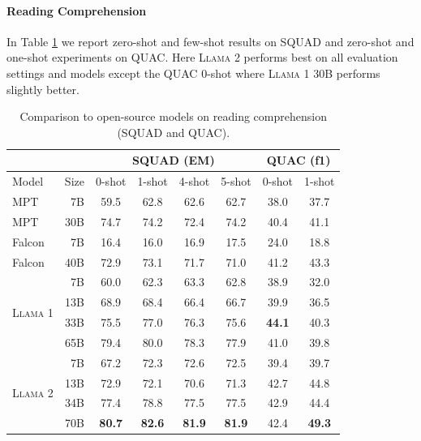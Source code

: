 \documentclass{article}
\newcommand{\anise}{\textsc{Llama 1}\xspace}
\newcommand{\cinnamon}{\textsc{Llama 2}\xspace}
\begin{document}
\paragraph{Reading Comprehension} In Table \ref{tab:reading_comprehension} we report zero-shot and few-shot results on SQUAD and zero-shot and one-shot experiments on QUAC. Here \cinnamon performs best on all evaluation settings and models except the QUAC 0-shot where \anise 30B performs slightly better. 
\begin{table}[]
\centering
\begin{tabular}{@{}lrcccccc@{}}
\toprule
 &  & \multicolumn{4}{c}{SQUAD (EM)} & \multicolumn{2}{c}{QUAC (f1)} \\ \midrule
Model & Size & 0-shot & 1-shot & 4-shot & 5-shot & 0-shot & 1-shot \\ \midrule
MPT & 7B & 59.5 & 62.8 & 62.6 & 62.7 & 38.0 & 37.7 \\
MPT & 30B & 74.7 & 74.2 & 72.4 & 74.2 & 40.4 & 41.1 \\ \midrule
Falcon & 7B & 16.4 & 16.0 & 16.9 & 17.5 & 24.0 & 18.8 \\
Falcon & 40B & 72.9 & 73.1 & 71.7 & 71.0 & 41.2 & 43.3 \\ \midrule
\multirow{4}{*}{\anise} & 7B & 60.0 & 62.3 & 63.3 & 62.8 & 38.9 & 32.0 \\
 & 13B & 68.9 & 68.4 & 66.4 & 66.7 & 39.9 & 36.5 \\
 & 33B & 75.5 & 77.0 & 76.3 & 75.6 & \textbf{44.1} & 40.3 \\
 & 65B & 79.4 & 80.0 & 78.3 & 77.9 & 41.0 & 39.8 \\ \midrule
\multirow{4}{*}{\cinnamon} & 7B & 67.2 & 72.3 & 72.6 & 72.5 & 39.4 & 39.7 \\
 & 13B & 72.9 & 72.1 & 70.6 & 71.3 & 42.7 & 44.8 \\
 & 34B & 77.4 & 78.8 & 77.5 & 77.5 & 42.9 & 44.4 \\
 & 70B & \textbf{80.7} & \textbf{82.6} & \textbf{81.9} & \textbf{81.9} & 42.4 & \textbf{49.3} \\ \bottomrule
\end{tabular}
\caption{Comparison to open-source models on reading comprehension (SQUAD and QUAC). }
\label{tab:reading_comprehension}
\end{table}
\end{document}
